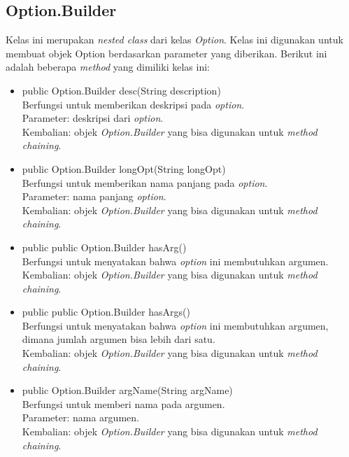 \subsection{Option.Builder}
\label{subsec:optionbuilder}
Kelas ini merupakan \textit{nested class} dari kelas \textit{Option}. Kelas ini digunakan untuk membuat objek Option berdasarkan parameter yang diberikan. Berikut ini adalah beberapa \textit{method} yang dimiliki kelas ini: 
\begin{itemize}
\item public Option.Builder desc(String description)\\
Berfungsi untuk memberikan deskripsi pada \textit{option}.\\
Parameter: deskripsi dari \textit{option}.\\
Kembalian: objek \textit{Option.Builder} yang bisa digunakan untuk \textit{method chaining}.

\item public Option.Builder longOpt(String longOpt)\\
Berfungsi untuk memberikan nama panjang pada \textit{option}.\\
Parameter: nama panjang \textit{option}.\\
Kembalian: objek \textit{Option.Builder} yang bisa digunakan untuk \textit{method chaining}.

\item public public Option.Builder hasArg()\\
Berfungsi untuk menyatakan bahwa \textit{option} ini membutuhkan argumen.\\
Kembalian: objek \textit{Option.Builder} yang bisa digunakan untuk \textit{method chaining}.

\item public public Option.Builder hasArgs()\\
Berfungsi untuk menyatakan bahwa \textit{option} ini membutuhkan argumen, dimana jumlah argumen bisa lebih dari satu.\\
Kembalian: objek \textit{Option.Builder} yang bisa digunakan untuk \textit{method chaining}.

\item public Option.Builder argName(String argName)\\
Berfungsi untuk memberi nama pada argumen.\\
Parameter: nama argumen.\\
Kembalian: objek \textit{Option.Builder} yang bisa digunakan untuk \textit{method chaining}.


\end{itemize}
